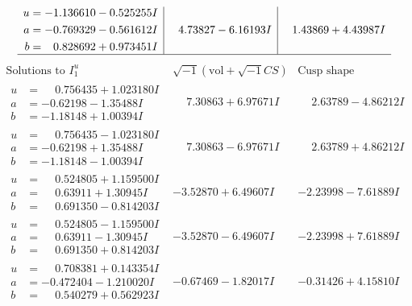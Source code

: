 \documentclass[1p]{elsarticle_modified}
\theoremstyle{definition}
\newcommand{\I}{\sqrt{-1}}
\begin{document}
$$\begin{array}{c|c|c}
\begin{aligned}
u &= -1.136610 - 0.525255 I \\
a &= -0.769329 - 0.561612 I \\
b &= \phantom{-}0.828692 + 0.973451 I\end{aligned}
 & \phantom{-}4.73827 - 6.16193 I & \phantom{-}1.43869 + 4.43987 I\\
 \hline 
 \end{array}$$\newpage$$\begin{array}{c|c|c}  
\text{Solutions to }I^u_{1}& \I (\text{vol} + \sqrt{-1}CS) & \text{Cusp shape}\\
 \hline 
\begin{aligned}
u &= \phantom{-}0.756435 + 1.023180 I \\
a &= -0.62198 - 1.35488 I \\
b &= -1.18148 + 1.00394 I\end{aligned}
 & \phantom{-}7.30863 + 6.97671 I & \phantom{-}2.63789 - 4.86212 I \\ \hline\begin{aligned}
u &= \phantom{-}0.756435 - 1.023180 I \\
a &= -0.62198 + 1.35488 I \\
b &= -1.18148 - 1.00394 I\end{aligned}
 & \phantom{-}7.30863 - 6.97671 I & \phantom{-}2.63789 + 4.86212 I \\ \hline\begin{aligned}
u &= \phantom{-}0.524805 + 1.159500 I \\
a &= \phantom{-}0.63911 + 1.30945 I \\
b &= \phantom{-}0.691350 - 0.814203 I\end{aligned}
 & -3.52870 + 6.49607 I & -2.23998 - 7.61889 I \\ \hline\begin{aligned}
u &= \phantom{-}0.524805 - 1.159500 I \\
a &= \phantom{-}0.63911 - 1.30945 I \\
b &= \phantom{-}0.691350 + 0.814203 I\end{aligned}
 & -3.52870 - 6.49607 I & -2.23998 + 7.61889 I \\ \hline\begin{aligned}
u &= \phantom{-}0.708381 + 0.143354 I \\
a &= -0.472404 - 1.210020 I \\
b &= \phantom{-}0.540279 + 0.562923 I\end{aligned}
 & -0.67469 - 1.82017 I & -0.31426 + 4.15810 I \\ \hline\begin{aligned}

\end{aligned}
\end{array}$$
\end{document}
